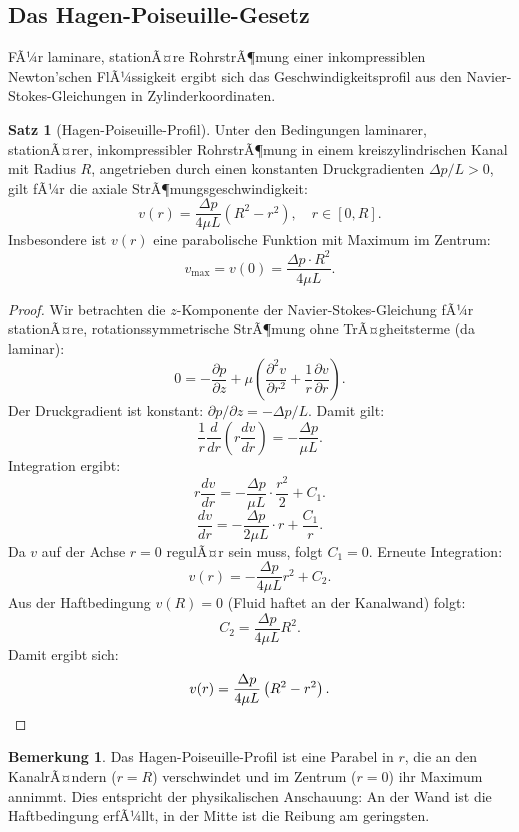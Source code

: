 ﻿\documentclass[a4paper,12pt]{article}
\theoremstyle{definition}
\newtheorem{satz}{Satz}
\newtheorem{bemerkung}{Bemerkung}
\begin{document}
\subsection{Das Hagen-Poiseuille-Gesetz}

FÃ¼r laminare, stationÃ¤re RohrstrÃ¶mung einer inkompressiblen Newton'schen FlÃ¼ssigkeit
ergibt sich das Geschwindigkeitsprofil aus den Navier-Stokes-Gleichungen in Zylinderkoordinaten.

\begin{satz}[Hagen-Poiseuille-Profil]
\label{satz:hp}
    Unter den Bedingungen laminarer, stationÃ¤rer, inkompressibler RohrstrÃ¶mung in einem
    kreiszylindrischen Kanal mit Radius $R$, angetrieben durch einen konstanten
    Druckgradienten $\Delta p / L > 0$, gilt fÃ¼r die axiale StrÃ¶mungsgeschwindigkeit:
    \[
    v(r) = \frac{\Delta p}{4\mu L} \left(R^2 - r^2\right), \quad r \in [0, R].
    \]
    Insbesondere ist $v(r)$ eine parabolische Funktion mit Maximum im Zentrum:
    \[
    v_{\max} = v(0) = \frac{\Delta p \cdot R^2}{4\mu L}.
    \]
\end{satz}

\begin{proof}
Wir betrachten die $z$-Komponente der Navier-Stokes-Gleichung fÃ¼r stationÃ¤re, rotations\-sym\-me\-tri\-sche
StrÃ¶mung ohne TrÃ¤gheitsterme (da laminar):
\[
0 = -\frac{\partial p}{\partial z} + \mu \left(\frac{\partial^2 v}{\partial r^2}
    + \frac{1}{r}\frac{\partial v}{\partial r}\right).
\]
Der Druckgradient ist konstant: $\partial p / \partial z = -\Delta p / L$.
Damit gilt:
\[
\frac{1}{r}\frac{d}{dr}\left(r \frac{dv}{dr}\right) = -\frac{\Delta p}{\mu L}.
\]
Integration ergibt:
\[
r \frac{dv}{dr} = -\frac{\Delta p}{\mu L} \cdot \frac{r^2}{2} + C_1.
\]
\[
\frac{dv}{dr} = -\frac{\Delta p}{2\mu L} \cdot r + \frac{C_1}{r}.
\]
Da $v$ auf der Achse $r=0$ regulÃ¤r sein muss, folgt $C_1 = 0$.
Erneute Integration:
\[
v(r) = -\frac{\Delta p}{4\mu L} r^2 + C_2.
\]
Aus der Haftbedingung $v(R) = 0$ (Fluid haftet an der Kanalwand) folgt:
\[
C_2 = \frac{\Delta p}{4\mu L} R^2.
\]
Damit ergibt sich:
\[
v(r) = \frac{\Delta p}{4\mu L}\left(R^2 - r^2\right). \qedhere
\]
\end{proof}

\begin{bemerkung}
Das Hagen-Poiseuille-Profil ist eine Parabel in $r$, die an den KanalrÃ¤ndern
($r = R$) verschwindet und im Zentrum ($r = 0$) ihr Maximum annimmt. Dies entspricht
der physikalischen Anschauung: An der Wand ist die Haftbedingung erfÃ¼llt, in der Mitte
ist die Reibung am geringsten.
\end{bemerkung}
\end{document}

